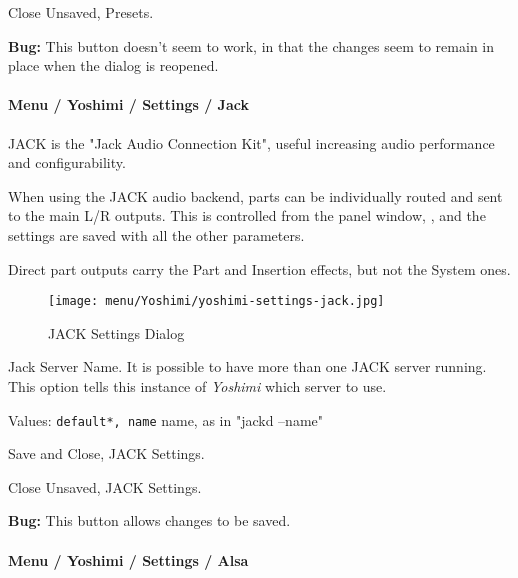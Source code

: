    Close Unsaved, Presets.
   
   \textbf{Bug:}
   This button doesn't seem to work, in that the changes seem to remain
   in place when the dialog is reopened.

\paragraph{Menu / Yoshimi / Settings / Jack}
\label{paragraph:menu_yoshimi_settings_jack}

   JACK is the "Jack Audio Connection Kit", useful increasing audio
   performance and configurability.

   When using the JACK audio backend, parts can be individually routed
   and sent to the main L/R outputs. This is controlled from the
   panel window,
   ,
   and the settings are saved with all the other parameters.

   Direct part outputs carry the Part and Insertion effects, but not the
   System ones.

\begin{figure}[H]
   \centering 
   \texttt{[image: menu/Yoshimi/yoshimi-settings-jack.jpg]}
   \caption[JACK Settings]{JACK Settings Dialog}
   \label{fig:yoshimi_settings_jack}
\end{figure}

   \setcounter{ItemCounter}{0}      %

   Jack Server Name.
   It is possible to have more than one JACK server running.  This option
   tells this instance of \textsl{Yoshimi} which server to use.

   Values: \texttt{default*, name} name, as in "jackd --name"

   Save and Close, JACK Settings.

   Close Unsaved, JACK Settings.

   \textbf{Bug:}
   This button allows changes to be saved.

\paragraph{Menu / Yoshimi / Settings / Alsa}
\label{paragraph:menu_yoshimi_settings_alsa}

